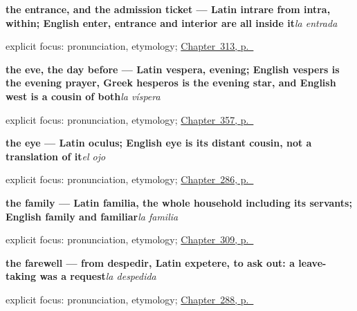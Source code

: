 \noindent\begin{minipage}[t]{\linewidth}
\raggedright
\textbf{the entrance, and the admission ticket — Latin intrare from intra, within; English enter, entrance and interior are all inside it}\enspace\emph{la entrada}\par
\footnotesize explicit focus: pronunciation, etymology; \hyperref[ch:el-mostrador]{Chapter~313, p.~\pageref*{ch:el-mostrador}}
\end{minipage}\par\smallskip

\noindent\begin{minipage}[t]{\linewidth}
\raggedright
\textbf{the eve, the day before — Latin vespera, evening; English vespers is the evening prayer, Greek hesperos is the evening star, and English west is a cousin of both}\enspace\emph{la víspera}\par
\footnotesize explicit focus: pronunciation, etymology; \hyperref[ch:la-navidad-y-la-pascua]{Chapter~357, p.~\pageref*{ch:la-navidad-y-la-pascua}}
\end{minipage}\par\smallskip

\noindent\begin{minipage}[t]{\linewidth}
\raggedright
\textbf{the eye — Latin oculus; English eye is its distant cousin, not a translation of it}\enspace\emph{el ojo}\par
\footnotesize explicit focus: pronunciation, etymology; \hyperref[ch:donde-duele]{Chapter~286, p.~\pageref*{ch:donde-duele}}
\end{minipage}\par\smallskip

\noindent\begin{minipage}[t]{\linewidth}
\raggedright
\textbf{the family --- Latin familia, the whole household including its servants; English family and familiar}\enspace\emph{la familia}\par
\footnotesize explicit focus: pronunciation, etymology; \hyperref[ch:familia-y-pareja]{Chapter~309, p.~\pageref*{ch:familia-y-pareja}}
\end{minipage}\par\smallskip

\noindent\begin{minipage}[t]{\linewidth}
\raggedright
\textbf{the farewell — from despedir, Latin expetere, to ask out: a leave-taking was a request}\enspace\emph{la despedida}\par
\footnotesize explicit focus: pronunciation, etymology; \hyperref[ch:la-partida]{Chapter~288, p.~\pageref*{ch:la-partida}}
\end{minipage}\par\smallskip

